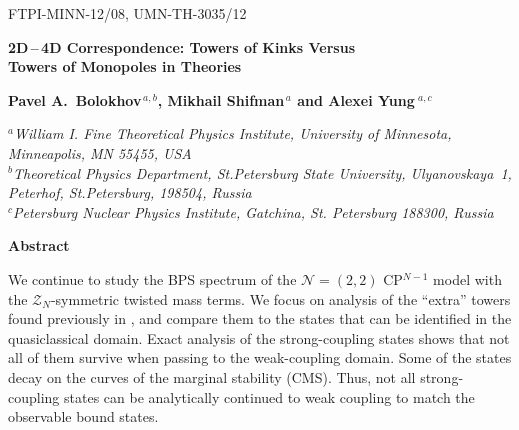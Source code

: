 \documentclass[epsfig,12pt]{article}
\newcommand{\mc}[1]{\mathcal{#1}}
\begin{document}



\begin{titlepage}

\begin{flushright}
%
FTPI-MINN-12/08, UMN-TH-3035/12\\
\end{flushright}

\vspace{0.3cm}

\begin{center}
{  \Large \bf  
			2D\,--\,4D Correspondence: Towers of Kinks Versus\\[1mm]  
			Towers of Monopoles
			in  Theories
			
}
\end{center}
\vspace{0.6cm}

\begin{center}

 {\large
 \bf   Pavel A.~Bolokhov$^{\,a,b}$,  Mikhail Shifman$^{\,a}$ and Alexei Yung$^{\,\,a,c}$}
\end {center}

\begin{center}

$^a${\it  William I. Fine Theoretical Physics Institute, University of Minnesota,
Minneapolis, MN 55455, USA}\\
$^b${\it Theoretical Physics Department, St.Petersburg State University, Ulyanovskaya~1, 
	 Peterhof, St.Petersburg, 198504, Russia}\\
$^{c}${\it Petersburg Nuclear Physics Institute, Gatchina, St. Petersburg
188300, Russia
}


\vspace{0.7cm}


{\large\bf Abstract}
\end{center}

	We continue to study the BPS spectrum of the ${\mathcal N}=(2,2)$ CP$^{N-1}$ model  with 
	the $ \mc{Z}_N $-symmetric twisted mass terms.
	We focus on analysis of the ``extra'' towers found previously in \cite{Bolokhov:2011mp},
	and compare them to the states that can be identified in the quasiclassical domain.
	Exact analysis of the strong-coupling states shows that not all of them survive when passing to the
	weak-coupling domain. 
	Some of the states decay on the curves of the marginal stability (CMS).
	Thus, not all strong-coupling states can be analytically continued to weak coupling 
	to match the observable bound states.
	

\end{titlepage}
\end{document}
